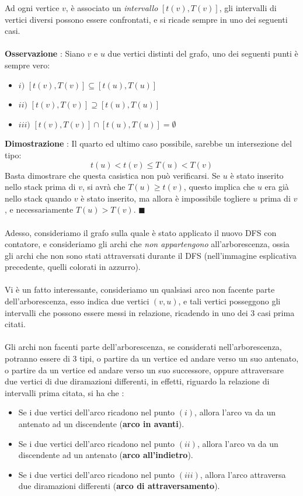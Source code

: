 \documentclass[12pt, letterpaper]{article}
\newcommand{\acc}{\\\hphantom{}\\}
\begin{document}
Ad ogni vertice \(v\), è associato un \textit{intervallo} \([t(v),T(v)]\), gli intervalli di vertici diversi possono
essere confrontati, e si ricade sempre in uno dei seguenti casi.\acc
\textbf{Osservazione} : Siano \(v\) e \(u\) due vertici distinti del grafo, uno dei seguenti punti è sempre vero:\begin{itemize}
    \item \(i)\) $[t(v),T(v)]\subseteq[t(u),T(u)]$
    \item \(ii)\) $[t(v),T(v)]\supseteq[t(u),T(u)]$
    \item \(iii)\) $[t(v),T(v)]\cap[t(u),T(u)]=\emptyset$
\end{itemize}
\textbf{Dimostrazione} : Il quarto ed ultimo caso possibile, sarebbe un intersezione del tipo: $$
    t(u)<t(v)\le T(u)<T(v)$$ Basta dimostrare che questa casistica non può verificarsi. Se \(u\) è stato inserito
nello stack prima di \(v\), si avrà che \(T(u)\ge t(v)\), questo implica che \(u\) era già nello stack quando
\(v\) è stato inserito, ma allora è impossibile togliere \(u\) prima di \(v\), e necessariamente \(T(u)>T(v)\). \(\blacksquare\)\acc
Adesso, consideriamo il grafo sulla quale è stato applicato il nuovo DFS con contatore, e consideriamo gli archi che \textit{non appartengono}
all'arborescenza, ossia gli archi che non sono stati attraversati durante il DFS (nell'immagine esplicativa precedente, quelli colorati in
azzurro). \acc
Vi è un fatto interessante, consideriamo  un qualsiasi arco non facente parte dell'arborescenza, esso indica due vertici \((v,u)\),
e tali vertici posseggono gli intervalli che possono essere messi in relazione, ricadendo in uno dei 3 casi prima citati.\acc Gli archi
non facenti parte dell'arborescenza, se considerati nell'arborescenza, potranno essere di 3 tipi, o partire da un vertice ed andare
verso un suo antenato, o partire da un vertice ed andare
verso un suo successore, oppure attraversare due vertici di due diramazioni differenti, in effetti, riguardo la relazione
di intervalli prima citata, si ha che : \begin{itemize}
    \item Se i due vertici dell'arco ricadono nel punto \((i)\), allora l'arco va da un antenato ad un discendente (\textbf{arco in avanti}).
    \item Se i due vertici dell'arco ricadono nel punto \((ii)\), allora l'arco va da un discendente ad un antenato  (\textbf{arco all'indietro}).
    \item Se i due vertici dell'arco ricadono nel punto \((iii)\), allora l'arco attraversa due diramazioni differenti  (\textbf{arco di attraversamento}).
\end{itemize}
\end{document}
